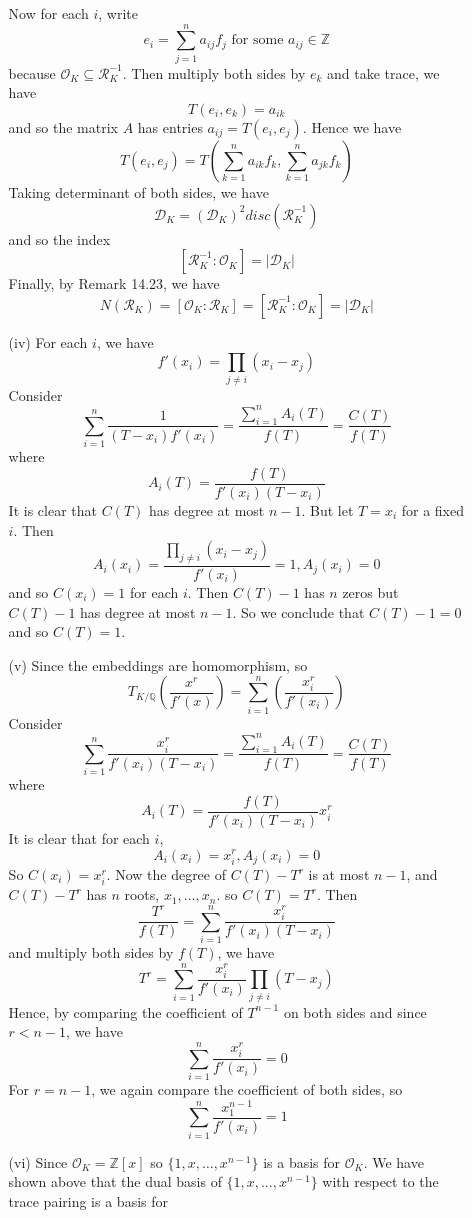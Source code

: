 \begin{enumerate}
\begin{enumerate}
    Now for each $i$, write
    $$e_i=\sum_{j=1}^n a_{ij}f_j \text{ for some } a_{ij} \in \mathbb{Z}$$
    because $\mathcal{O}_K \subseteq \mathcal{R}^{-1}_K$. Then multiply both sides by $e_k$ and take trace, we have
    $$T(e_i,e_k)=a_{ik}$$
    and so the matrix $A$ has entries $a_{ij}=T(e_i,e_j)$. Hence we have
    $$T(e_i,e_j)=T(\sum_{k=1}^n a_{ik}f_k,\sum_{k=1}^n a_{jk}f_k)$$
    Taking determinant of both sides, we have
    $$\mathcal{D}_K=(\mathcal{D}_K)^2 disc(\mathcal{R}^{-1}_K)$$
    and so the index $$[\mathcal{R}^{-1}_K:\mathcal{O}_K]=|\mathcal{D}_K|$$
    Finally, by Remark 14.23, we have
    $$N(\mathcal{R}_K)=[\mathcal{O}_K:\mathcal{R}_K]=[\mathcal{R}^{-1}_K:\mathcal{O}_K]=|\mathcal{D}_K|$$
\item[(iv)] For each $i$, we have
    $$f'(x_i)=\prod_{j \neq i}(x_i-x_j)$$
    Consider
    $$\sum_{i=1}^n \frac{1}{(T-x_i)f'(x_i)}=\frac{\sum_{i=1}^n A_i(T)}{f(T)}=\frac{C(T)}{f(T)}$$
    where
    $$A_i(T)=\frac{f(T)}{f'(x_i)(T-x_i)}$$
    It is clear that $C(T)$ has degree at most $n-1$.
    But let $T=x_i$ for a fixed $i$. Then
    $$A_i(x_i)=\frac{\prod_{j \neq i}(x_i-x_j)}{f'(x_i)}=1, A_j(x_i)=0$$
    and so $C(x_i)=1$ for each $i$. Then $C(T)-1$ has $n$ zeros but $C(T)-1$ has degree at most $n-1$. So we
    conclude that $C(T)-1=0$ and so $C(T)=1$.
\item[(v)] Since the embeddings are homomorphism, so
    $$T_{K/\mathbb{Q}}\left(\frac{x^r}{f'(x)}\right)=\sum_{i=1}^n \left(\frac{x^r_i}{f'(x_i)}\right)$$
    Consider
    $$\sum_{i=1}^n \frac{x^r_i}{f'(x_i)(T-x_i)}=\frac{\sum_{i=1}^n A_i(T)}{f(T)}=\frac{C(T)}{f(T)}$$
    where
    $$A_i(T)=\frac{f(T)}{f'(x_i)(T-x_i)}x^r_i$$
    It is clear that for each $i$,
    $$A_i(x_i)=x^r_i, A_j(x_i)=0$$
    So $C(x_i)=x^r_i$. Now the degree of $C(T)-T^r$ is at most $n-1$,
    and $C(T)-T^r$ has $n$ roots, $x_1,\ldots,x_n$. so $C(T)=T^r$. Then
    $$\frac{T^r}{f(T)}=\sum_{i=1}^n \frac{x^r_i}{f'(x_i)(T-x_i)}$$
    and multiply both sides by $f(T)$, we have
    $$T^r=\sum_{i=1}^n \frac{x^r_i}{f'(x_i)} \prod_{j \neq i}(T-x_j)$$
    Hence, by comparing the coefficient of $T^{n-1}$ on both sides and since $r <n-1$, we have
    $$\sum_{i=1}^n \frac{x^r_i}{f'(x_i)}=0$$
    For $r=n-1$, we again compare the coefficient of both sides, so
    $$\sum_{i=1}^n \frac{x^{n-1}_1}{f'(x_i)}=1$$
\item[(vi)] Since $\mathcal{O}_K=\mathbb{Z}[x]$ so $\{1,x,\ldots,x^{n-1}\}$ is a basis for $\mathcal{O}_K$.
    We have
    shown above that the dual basis of $\{1,x,\ldots,x^{n-1}\}$ with respect to the trace pairing is a basis for

\end{enumerate}
\end{enumerate}
